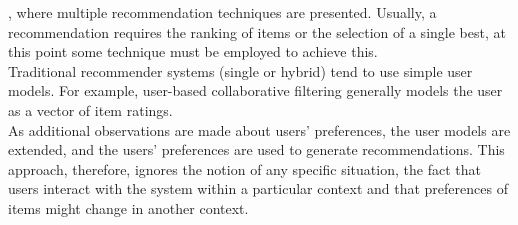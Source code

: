 \cite{tran2000hybrid}, where multiple recommendation
techniques are presented. Usually, a recommendation requires the ranking of
items or the selection of a single best, at this point some
technique must be employed to achieve this. \\ 
Traditional recommender systems (single or hybrid) tend to use
simple user models. For example, user-based collaborative filtering
generally models the user as a vector of item ratings. \\ As additional
observations are made about users' preferences, the user models are
extended, and the users' preferences are used to generate
recommendations. This approach, therefore, ignores the notion of any
specific situation, the fact that users interact with the system
within a particular context and  that preferences of items might 
change in another context. 

